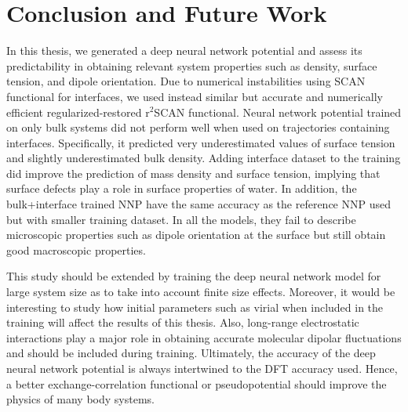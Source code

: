\chapter{Conclusion and Future Work}

In this thesis, we generated a deep neural network potential and assess its
predictability in obtaining relevant system properties such as density, surface
tension, and dipole orientation. Due to numerical instabilities using SCAN functional for interfaces, we used instead  similar  but accurate and numerically efficient regularized-restored r$^2$SCAN functional. Neural network potential trained on only bulk
systems did not perform well when used on trajectories containing interfaces.
Specifically, it predicted very underestimated values of surface tension and
slightly underestimated bulk density. Adding interface dataset to the training
did improve the prediction of mass density and surface tension, implying that surface defects
play a role in surface properties of water. In addition, the bulk+interface trained NNP have the same accuracy as the reference NNP used but with smaller training dataset. In all the models, they fail to describe microscopic properties such as dipole orientation at the surface but still obtain good macroscopic properties.

This study should be extended by training the deep neural network model for large system size as to take into account finite size effects. Moreover, it would be interesting to study how initial parameters such as virial when included in the training will affect the results of this thesis. Also, long-range electrostatic interactions play a major role in obtaining accurate molecular dipolar fluctuations and should be included during training. Ultimately, the accuracy of the deep neural network potential is always intertwined to the DFT accuracy used. Hence, a better exchange-correlation functional or pseudopotential should improve the physics of many body systems.
